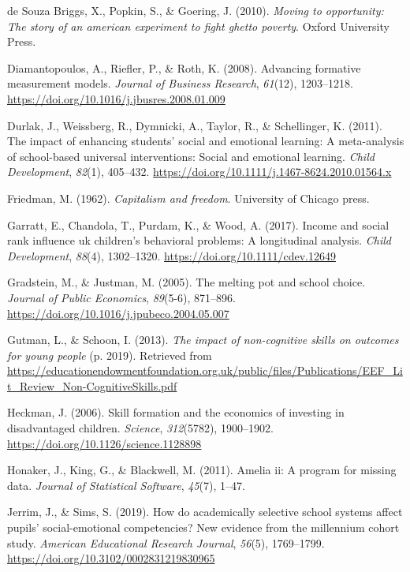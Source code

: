 \documentclass[
  english,
  man]{apa6}
\newlength{\cslhangindent}
\newenvironment{cslreferences}%
  {\setlength{\parindent}{0pt}%
  \everypar{\setlength{\hangindent}{\cslhangindent}}\ignorespaces}%
  {\par}
\begin{document}
\begin{cslreferences}
\leavevmode\hypertarget{ref-desouzabriggs2010}{}%
de Souza Briggs, X., Popkin, S., \& Goering, J. (2010). \emph{Moving to opportunity: The story of an american experiment to fight ghetto poverty}. Oxford University Press.

\leavevmode\hypertarget{ref-diamantopoulos2008}{}%
Diamantopoulos, A., Riefler, P., \& Roth, K. (2008). Advancing formative measurement models. \emph{Journal of Business Research}, \emph{61}(12), 1203--1218. \url{https://doi.org/10.1016/j.jbusres.2008.01.009}

\leavevmode\hypertarget{ref-durlak2011}{}%
Durlak, J., Weissberg, R., Dymnicki, A., Taylor, R., \& Schellinger, K. (2011). The impact of enhancing students' social and emotional learning: A meta-analysis of school-based universal interventions: Social and emotional learning. \emph{Child Development}, \emph{82}(1), 405--432. \url{https://doi.org/10.1111/j.1467-8624.2010.01564.x}

\leavevmode\hypertarget{ref-friedman1962}{}%
Friedman, M. (1962). \emph{Capitalism and freedom}. University of Chicago press.

\leavevmode\hypertarget{ref-garratt2017}{}%
Garratt, E., Chandola, T., Purdam, K., \& Wood, A. (2017). Income and social rank influence uk children's behavioral problems: A longitudinal analysis. \emph{Child Development}, \emph{88}(4), 1302--1320. \url{https://doi.org/10.1111/cdev.12649}

\leavevmode\hypertarget{ref-gradstein2005}{}%
Gradstein, M., \& Justman, M. (2005). The melting pot and school choice. \emph{Journal of Public Economics}, \emph{89}(5-6), 871--896. \url{https://doi.org/10.1016/j.jpubeco.2004.05.007}

\leavevmode\hypertarget{ref-gutman2013}{}%
Gutman, L., \& Schoon, I. (2013). \emph{The impact of non-cognitive skills on outcomes for young people} (p. 2019). Retrieved from \url{https://educationendowmentfoundation.org.uk/public/files/Publications/EEF_Lit_Review_Non-CognitiveSkills.pdf}

\leavevmode\hypertarget{ref-heckman2006}{}%
Heckman, J. (2006). Skill formation and the economics of investing in disadvantaged children. \emph{Science}, \emph{312}(5782), 1900--1902. \url{https://doi.org/10.1126/science.1128898}

\leavevmode\hypertarget{ref-honaker2011}{}%
Honaker, J., King, G., \& Blackwell, M. (2011). Amelia ii: A program for missing data. \emph{Journal of Statistical Software}, \emph{45}(7), 1--47.

\leavevmode\hypertarget{ref-jerrim2019}{}%
Jerrim, J., \& Sims, S. (2019). How do academically selective school systems affect pupils' social-emotional competencies? New evidence from the millennium cohort study. \emph{American Educational Research Journal}, \emph{56}(5), 1769--1799. \url{https://doi.org/10.3102/0002831219830965}


\end{cslreferences}
\end{document}
